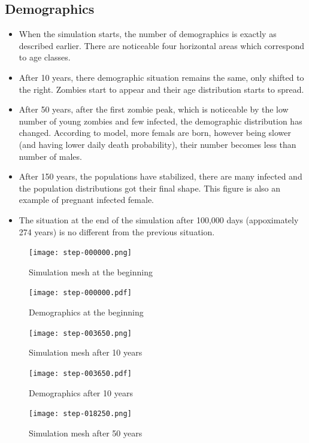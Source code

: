 \documentclass[a4paper]{article}
\begin{document}
\subsection{Demographics}

\begin{itemize}
\item When the simulation starts, the number of demographics is exactly as described earlier.
    There are noticeable four horizontal areas which correspond to age classes.
\item After 10 years, there demographic situation remains the same, only shifted to the right.
    Zombies start to appear and their age distribution starts to spread.
\item After 50 years, after the first zombie peak, which is noticeable by the low number of young zombies and few infected, the demographic distribution has changed.
    According to model, more femals are born, however being slower (and having lower daily death probability), their number becomes less than number of males.
\item After 150 years, the populations have stabilized, there are many infected and the population distributions got their final shape.
    This figure is also an example of pregnant infected female.
\item The situation at the end of the simulation after 100,000 days (appoximately 274 years) is no different from the previous situation.
\end{itemize}

\begin{figure}[pht]
    \centering
    \texttt{[image: step-000000.png]}
    \caption{Simulation mesh at the beginning}
\end{figure}

\begin{figure}[pht]
    \centering
    \texttt{[image: step-000000.pdf]}
    \caption{Demographics at the beginning}
\end{figure}

\begin{figure}[pht]
    \centering
    \texttt{[image: step-003650.png]}
    \caption{Simulation mesh after 10 years}
\end{figure}

\begin{figure}[pht]
    \centering
    \texttt{[image: step-003650.pdf]}
    \caption{Demographics after 10 years}
\end{figure}

\begin{figure}[pht]
    \centering
    \texttt{[image: step-018250.png]}
    \caption{Simulation mesh after 50 years}
\end{figure}
\end{document}
